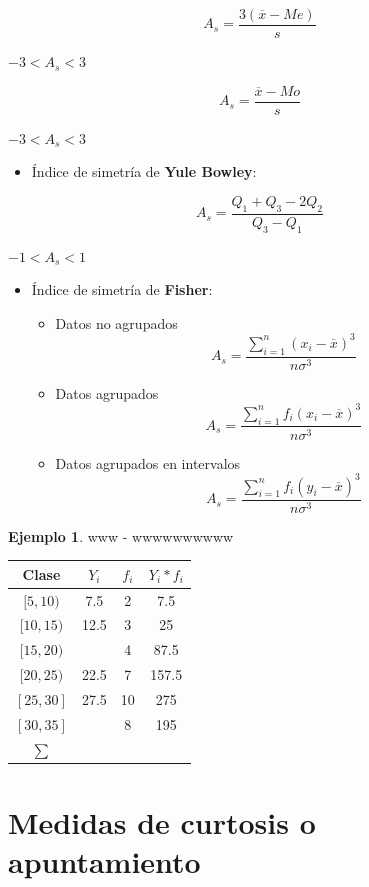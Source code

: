 \documentclass[
  11pt,
]{krantz}
\providecommand{\tightlist}{%
  \setlength{\itemsep}{0pt}\setlength{\parskip}{0pt}}
\theoremstyle{definition}
\theoremstyle{definition}
\newtheorem{example}{Ejemplo}[chapter]
\theoremstyle{definition}
\theoremstyle{definition}
\theoremstyle{remark}
\begin{document}
\[
A_s=\frac{3(\overline{x}-Me)}{s}
\]

\(-3<A_s<3\)

\[
A_s=\frac{\overline{x}-Mo}{s}
\]

\(-3<A_s<3\)

\begin{itemize}
\tightlist
\item
  Índice de simetría de \textbf{Yule Bowley}:
\end{itemize}

\[
A_s=\frac{Q_1+Q_3-2Q_2}{Q_3-Q_1}
\]

\(-1<A_s<1\)

\begin{itemize}
\item
  Índice de simetría de \textbf{Fisher}:

  \begin{itemize}
  \item
    Datos no agrupados
    \[
    A_s=\frac{\sum_{i=1}^{n}\left( x_i-\overline{x}\right)^3}{n\sigma^3}
    \]
  \item
    Datos agrupados
    \[
    A_s=\frac{\sum_{i=1}^{n}f_i\left( x_i-\overline{x}\right)^3}{n\sigma^3}
    \]
  \item
    Datos agrupados en intervalos
    \[
    A_s=\frac{\sum_{i=1}^{n}f_i\left( y_i-\overline{x}\right)^3}{n\sigma^3}
    \]
  \end{itemize}
\end{itemize}

\begin{example}

www - wwwwwwwwww

\begin{longtable}[]{@{}cccc@{}}
\toprule
Clase & \(Y_i\) & \(f_i\) & \(Y_i*f_i\) \\
\midrule
\endhead
\([5,10)\) & 7.5 & 2 & 7.5 \\
\([10,15)\) & 12.5 & 3 & 25 \\
\([15,20)\) & & 4 & 87.5 \\
\([20,25)\) & 22.5 & 7 & 157.5 \\
\([25,30]\) & 27.5 & 10 & 275 \\
\([30,35]\) & & 8 & 195 \\
\(\sum\) & & & \\
\bottomrule
\end{longtable}

\end{example}

\hypertarget{medidas-de-curtosis-o-apuntamiento}{%
\chapter{Medidas de curtosis o apuntamiento}\label{medidas-de-curtosis-o-apuntamiento}}
\end{document}
